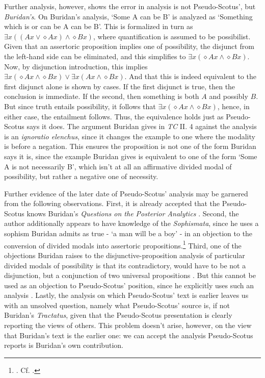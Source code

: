 	Further analysis, however, shows the error in analysis is not Pseudo-Scotus', but \textit{Buridan's}. On Buridan's analysis, `Some A can be B' is analyzed as `Something which is or can be A can be B'. This is formalized in turn as $\exists x((Ax \vee \diamond Ax) \wedge \diamond Bx)$, where quantification is assumed to be possibilist. Given that an assertoric proposition implies one of possibility, the disjunct from the left-hand side can be eliminated, and this simplifies to $\exists x(\diamond Ax \wedge \diamond Bx)$. Now, by disjunction introduction, this implies $\exists x(\diamond Ax \wedge \diamond Bx) \vee \exists x(Ax \wedge \diamond Bx)$. And that this is indeed equivalent to the first disjunct alone is shown by cases. If the first disjunct is true, then the conclusion is immediate. If the second, then something is both $A$ and possibly $B$. But since truth entails possibility, it follows that $\exists x(\diamond Ax \wedge \diamond Bx)$, hence, in either case, the entailment follows. Thus, the equivalence holds just as Pseudo-Scotus says it does. The argument Buridan gives in \textit{TC} II. 4 against the analysis is an \textit{ignoratio elenchus}, since it changes the example to one where the modality is before a negation. This ensures the proposition is not one of the form Buridan says it is, since the example Buridan gives is equivalent to one of the form `Some A is not necessarily B', which isn't at all an affirmative divided modal of possibility, but rather a negative one of necessity.
	
	Further evidence of the later date of Pseudo-Scotus' analysis may be garnered from the following observations. First, it is already accepted that the Pseudo-Scotus knows Buridan's \textit{Questions on the Posterior Analytics} \cite[pp. 4-5]{Read2015}. Second, the author additionally appears to have knowledge of the \textit{Sophismata}, since he uses a sophism Buridan admits as true - `a man will be a boy' - in an objection to the conversion of divided modals into assertoric propositions.\footnote{\cite[I, q. 26, p. 143]{Pseudo-Scotus1891}. Cf. \cite[pp. 878, 888]{BuridanKlimaSD}.} Third, one of the objections Buridan raises to the disjunctive-proposition analysis of particular divided modals of possibility is that its contradictory, would have to be not a disjunction, but a conjunction of two universal propositions \cite[II. 4, p. 98]{Buridan2015}. But this cannot be used as an objection to Pseudo-Scotus' position, since he explicitly uses such an analysis \cite[I, q. 26, p. 144]{Pseudo-Scotus1891}. Lastly, the analysis on which Pseudo-Scotus' text is earlier leaves us with an unsolved question, namely what Pseudo-Scotus' source is, if not Buridan's \textit{Tractatus}, given that the Pseudo-Scotus presentation is clearly reporting the views of others. This problem doesn't arise, however, on the view that Buridan's text is the earlier one: we can accept the analysis Pseudo-Scotus reports is Buridan's own contribution.
	
